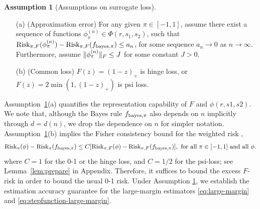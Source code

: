 \documentclass[aos]{imsart}
\theoremstyle{definition}
\newtheorem{assumption}{Assumption}
\def\risk{\textup{Risk}}
\def\bayespif{f_{\textup{bayes},\pi}}
\def\riskF{\textup{Risk}_{\pi,F}}
\begin{document}
\begin{assumption}[Assumptions on surrogate loss]\label{ass:main} \hfill
\begin{enumerate}
\item[(a)] (Approximation error) For any given $\pi\in[-1,1]$, assume there exist a sequence of functions $\phi^{(n)}_\pi\in\Phi(r,s_1,s_2)$, such that $\riskF(\phi^{(n)}_\pi)-\riskF(\bayespif)\leq a_n$, for some sequence $a_n\to 0$ as $n\to\infty$. Furthermore, assume $\lVert\phi_{\pi}^{(n)}\rVert_F \leq J$ for some constant $J>0$. 
\item[(b)] (Common loss) $F(z)=(1-z)_{+}$ is hinge loss, or $F(z)=2\min(1,(1-z)_{+})$ is psi loss. 
\end{enumerate}
\end{assumption}

\noindent
Assumption~\ref{ass:main}(a) quantifies the representation capability of $F$ and $\phi(r, s1, s2)$. We note that, although the Bayes rule $\bayespif$ also depends on $n$ implicitly through $d=d(n)$, we drop the dependence on $n$ for simpler notation. Assumption~\ref{ass:main}(b) implies the Fisher consistency bound for the weighted risk \cite{scott2011surrogate},
\begin{equation*} \label{eq:fisher}
\risk_\pi(\phi)-\risk_\pi(\bayespif)\leq C[\riskF(\phi)-\riskF(\bayespif)], \text{ for all $\pi\in[-1,1]$ and all $\phi$}.
\end{equation*}
where $C=1$ for the 0-1 or the hinge loss, and $C=1/2$ for the psi-loss; see Lemma~\ref{lem:prepare} in Appendix. Therefore, it suffices to bound the excess $F$-risk in order to bound the usual 0-1 risk. Under Assumption \ref{ass:main}, we establish the estimation accuracy guarantee for the large-margin estimators \eqref{eq:large-margin} and \eqref{eq:stepfunction-large-margin}. 
\end{document}
